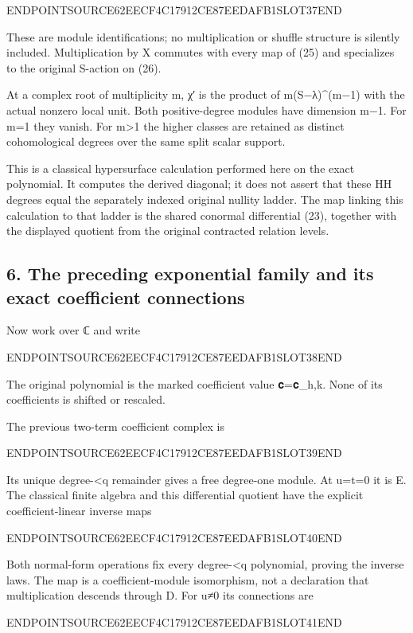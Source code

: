 ENDPOINTSOURCE62EECF4C17912CE87EEDAFB1SLOT37END

These are module identifications; no multiplication or shuffle structure is silently included. Multiplication by X commutes with every map of (25) and specializes to the original S-action on (26).

At a complex root of multiplicity m, χ′ is the product of m(S−λ)\^{}(m−1) with the actual nonzero local unit. Both positive-degree modules have dimension m−1. For m=1 they vanish. For m\textgreater1 the higher classes are retained as distinct cohomological degrees over the same split scalar support.

This is a classical hypersurface calculation performed here on the exact polynomial. It computes the derived diagonal; it does not assert that these HH degrees equal the separately indexed original nullity ladder. The map linking this calculation to that ladder is the shared conormal differential (23), together with the displayed quotient from the original contracted relation levels.

\subsection{6. The preceding exponential family and its exact coefficient connections}\label{endpoint-sga_trace_period--the-preceding-exponential-family-and-its-exact-coefficient-connections}

Now work over ℂ and write

ENDPOINTSOURCE62EECF4C17912CE87EEDAFB1SLOT38END

The original polynomial is the marked coefficient value 𝐜=𝐜\_h,k. None of its coefficients is shifted or rescaled.

The previous two-term coefficient complex is

ENDPOINTSOURCE62EECF4C17912CE87EEDAFB1SLOT39END

Its unique degree-\textless q remainder gives a free degree-one module. At u=t=0 it is E. The classical finite algebra and this differential quotient have the explicit coefficient-linear inverse maps

ENDPOINTSOURCE62EECF4C17912CE87EEDAFB1SLOT40END

Both normal-form operations fix every degree-\textless q polynomial, proving the inverse laws. The map is a coefficient-module isomorphism, not a declaration that multiplication descends through D. For u≠0 its connections are

ENDPOINTSOURCE62EECF4C17912CE87EEDAFB1SLOT41END

